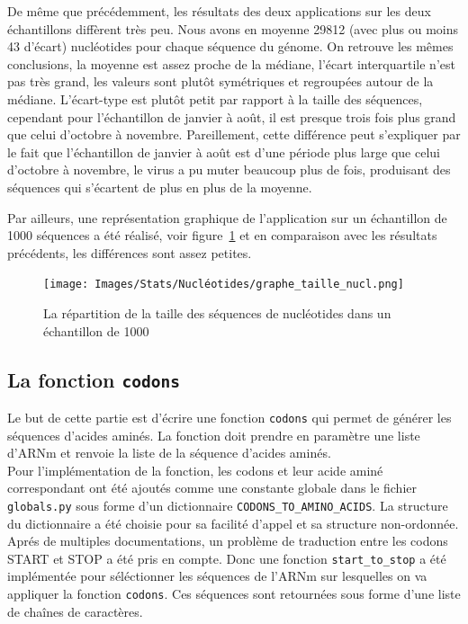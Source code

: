 \documentclass[12pt]{article}
\begin{document}
De même que précédemment, les résultats des deux applications sur les deux échantillons diffèrent très peu. Nous avons en moyenne 29812 (avec plus ou moins 43 d'écart) nucléotides pour chaque séquence du génome. On retrouve les mêmes conclusions, la moyenne est assez proche de la médiane, l'écart interquartile n'est pas très grand, les valeurs sont plutôt symétriques et regroupées autour de la médiane. L'écart-type est plutôt petit par rapport à la taille des séquences, cependant pour l'échantillon de janvier à août, il est presque trois fois plus grand que celui d'octobre à novembre. Pareillement, cette différence peut s'expliquer par le fait que l'échantillon de janvier à août est d'une période plus large que celui d'octobre à novembre, le virus a pu muter beaucoup plus de fois, produisant des séquences qui s'écartent de plus en plus de la moyenne.

Par ailleurs, une représentation graphique de l'application sur un échantillon de 1000 séquences a été réalisé, voir figure~\ref{graph:taillenucl} et en comparaison avec les résultats précédents, les différences sont assez petites.
    \begin{figure}[!h]
        \centering
        \texttt{[image: Images/Stats/Nucléotides/graphe\_taille\_nucl.png]}
        \caption{La répartition de la taille des séquences de nucléotides dans un échantillon de 1000}      \label{graph:taillenucl}
    \end{figure}



\subsection{La fonction \texttt{codons}}

Le but de cette partie est d'écrire une fonction \texttt{codons} qui permet de générer les séquences d'acides aminés. La fonction doit prendre en paramètre une liste d'ARNm et renvoie la liste de la séquence d'acides aminés. \\

Pour l'implémentation de la fonction, les codons et leur acide aminé correspondant ont été ajoutés comme une constante globale dans le fichier \texttt{globals.py} sous forme d'un dictionnaire  \texttt{CODONS\_TO\_AMINO\_ACIDS}. La structure du dictionnaire a été choisie pour sa facilité d'appel et sa structure non-ordonnée. \\

\label{subsec:imp_codons}
Aprés de multiples documentations, un problème de traduction entre les codons START et STOP a été pris en compte. Donc une fonction \texttt{start\_to\_stop} a été implémentée pour séléctionner les séquences de l'ARNm sur lesquelles on va appliquer la fonction \texttt{codons}. Ces séquences sont retournées sous forme d'une liste de chaînes de caractères. \
\end{document}
